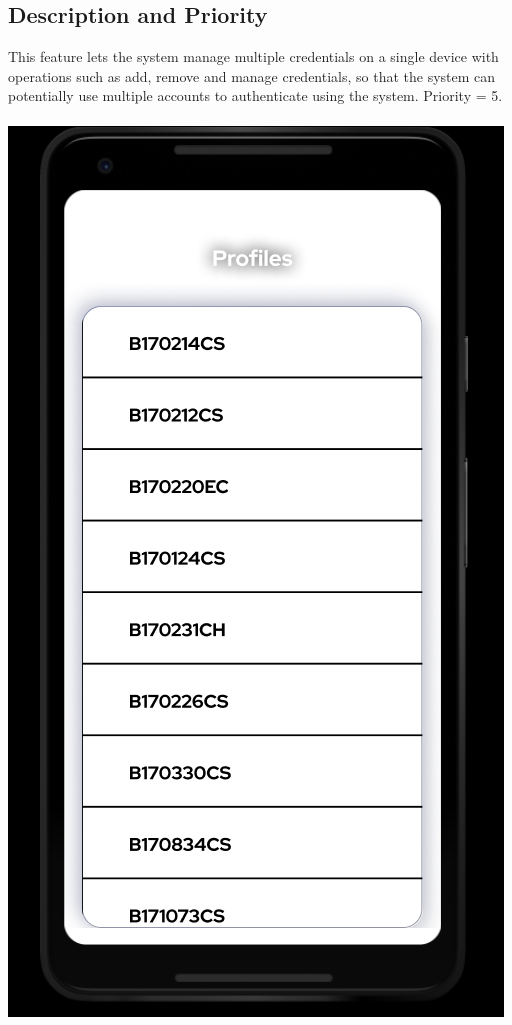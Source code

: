 \subsection{Description and Priority}
This feature lets the system manage multiple credentials on a single device with operations such as add, remove and manage credentials, so that the system can potentially use multiple accounts to authenticate using the system.
Priority = 5.\\ \\
\includegraphics[scale=0.3]{images/list.png}
